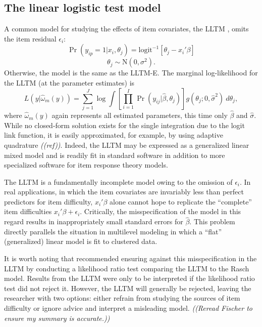 \subsection{The linear logistic test model}

A common model for studying the effects of item covariates, the LLTM \parencite[][]{Fischer1973}, omits the item residual $\epsilon_i$:
\begin{equation}
	\Pr(y_{ip} = 1 | x_i, \theta_j) =
	\mathrm{logit}^{-1} \left [ \theta_j - x_i'\beta \right ]
\end{equation}
\begin{equation}
	\theta_j \sim \mathrm{N}(0, \sigma^2)
.\end{equation}
Otherwise, the model is the same as the LLTM-E.
The marginal log-likelihood for the LLTM (at the parameter estimates) is
\begin{equation} \label{eq:lltm-likelihood}
	L(y | \hat \omega_m(y)) = 
	\sum_{j=1}^J \log
	\int 
		\left [ \prod_{i=1}^I \Pr(y_{ij} | \hat \beta, \theta_j) \right ]
		g(\theta_j ; 0, \hat \sigma^2)
	~d \theta_j
,\end{equation}
where $\hat \omega_m(y)$ again represents all estimated parameters, this time only $\hat \beta$ and $\hat \sigma$.
While no closed-form solution exists for the single integration due to the logit link function, it is easily approximated, for example, by using adaptive quadrature \emph{((ref))}. Indeed, the LLTM may be expressed as a generalized linear mixed model and is readily fit in standard software in addition to more specialized software for item response theory models.

The LLTM is a fundamentally incomplete model owing to the omission of $\epsilon_i$. In real applications, in which the item covariates are invariably less than perfect predictors for item difficulty, $x_i' \beta$ alone cannot hope to replicate the ``complete'' item difficulties $x_i' \beta + \epsilon_i$. Critically, the misspecification of the model in this regard results in inappropriately small standard errors for $\hat \beta$. This problem directly parallels the situation in multilevel modeling in which a ``flat'' (generalized) linear model is fit to clustered data. 

It is worth noting that \textcite{Fischer1973} recommended ensuring against this misspecification in the LLTM by conducting a likelihood ratio test comparing the LLTM to the Rasch model. Results from the LLTM were only to be interpreted if the likelihood ratio test did not reject it. However, the LLTM will generally be rejected, leaving the researcher with two options: either refrain from studying the sources of item difficulty or ignore advice and interpret a misleading model. 
\emph{((Reread Fischer to ensure my summary is accurate.))}


